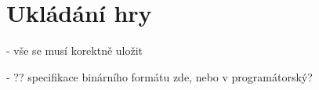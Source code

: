 
\section{Ukládání hry}

- vše se musí korektně uložit

- ?? specifikace binárního formátu zde, nebo v programátorský?